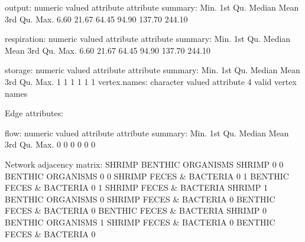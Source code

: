 \documentclass[11pt]{article}
\begin{document}
\begin{Schunk}
\begin{Soutput}
 output:
   numeric valued attribute
   attribute summary:
   Min. 1st Qu.  Median    Mean 3rd Qu.    Max. 
   6.60   21.67   64.45   94.90  137.70  244.10 

 respiration:
   numeric valued attribute
   attribute summary:
   Min. 1st Qu.  Median    Mean 3rd Qu.    Max. 
   6.60   21.67   64.45   94.90  137.70  244.10 

 storage:
   numeric valued attribute
   attribute summary:
   Min. 1st Qu.  Median    Mean 3rd Qu.    Max. 
      1       1       1       1       1       1 
  vertex.names:
   character valued attribute
   4 valid vertex names

Edge attributes:

 flow:
   numeric valued attribute
   attribute summary:
   Min. 1st Qu.  Median    Mean 3rd Qu.    Max. 
      0       0       0       0       0       0 

Network adjacency matrix:
                         SHRIMP BENTHIC ORGANISMS
SHRIMP                        0                 0
BENTHIC ORGANISMS             0                 0
SHRIMP FECES & BACTERIA       0                 1
BENTHIC FECES & BACTERIA      0                 1
                         SHRIMP FECES & BACTERIA
SHRIMP                                         1
BENTHIC ORGANISMS                              0
SHRIMP FECES & BACTERIA                        0
BENTHIC FECES & BACTERIA                       0
                         BENTHIC FECES & BACTERIA
SHRIMP                                          0
BENTHIC ORGANISMS                               1
SHRIMP FECES & BACTERIA                         0
BENTHIC FECES & BACTERIA                        0
\end{Soutput}
\end{Schunk}

\end{document}
